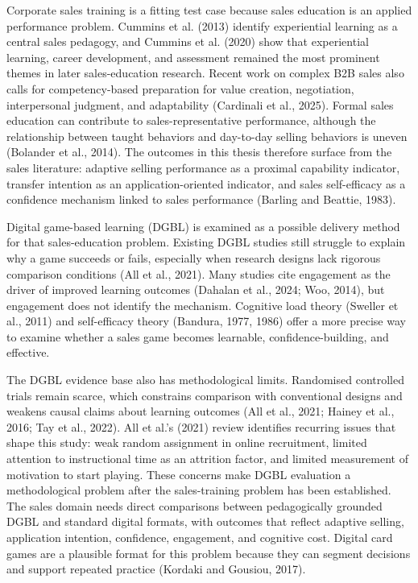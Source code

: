 \documentclass[12pt]{report}
\begin{document}
Corporate sales training is a fitting test case because sales education is an applied performance problem. Cummins et al. (2013) identify experiential learning as a central sales pedagogy, and Cummins et al. (2020) show that experiential learning, career development, and assessment remained the most prominent themes in later sales-education research. Recent work on complex B2B sales also calls for competency-based preparation for value creation, negotiation, interpersonal judgment, and adaptability (Cardinali et al., 2025). Formal sales education can contribute to sales-representative performance, although the relationship between taught behaviors and day-to-day selling behaviors is uneven (Bolander et al., 2014). The outcomes in this thesis therefore surface from the sales literature: adaptive selling performance as a proximal capability indicator, transfer intention as an application-oriented indicator, and sales self-efficacy as a confidence mechanism linked to sales performance (Barling and Beattie, 1983).

Digital game-based learning (DGBL) is examined as a possible delivery method for that sales-education problem. Existing DGBL studies still struggle to explain why a game succeeds or fails, especially when research designs lack rigorous comparison conditions (All et al., 2021). Many studies cite engagement as the driver of improved learning outcomes (Dahalan et al., 2024; Woo, 2014), but engagement does not identify the mechanism. Cognitive load theory (Sweller et al., 2011) and self-efficacy theory (Bandura, 1977, 1986) offer a more precise way to examine whether a sales game becomes learnable, confidence-building, and effective.

The DGBL evidence base also has methodological limits. Randomised controlled trials remain scarce, which constrains comparison with conventional designs and weakens causal claims about learning outcomes (All et al., 2021; Hainey et al., 2016; Tay et al., 2022). All et al.'s (2021) review identifies recurring issues that shape this study: weak random assignment in online recruitment, limited attention to instructional time as an attrition factor, and limited measurement of motivation to start playing. These concerns make DGBL evaluation a methodological problem after the sales-training problem has been established. The sales domain needs direct comparisons between pedagogically grounded DGBL and standard digital formats, with outcomes that reflect adaptive selling, application intention, confidence, engagement, and cognitive cost. Digital card games are a plausible format for this problem because they can segment decisions and support repeated practice (Kordaki and Gousiou, 2017).
\end{document}
